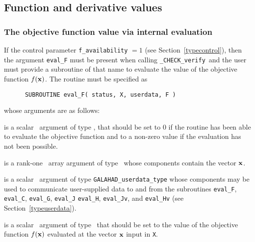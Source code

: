 \documentclass{galahad}
\newcommand{\packagename}{CHECK}
\newcommand{\fullpackagename}{\libraryname\_\packagename}
\newcommand{\solver}{{\tt \fullpackagename\_verify}}
\begin{document}

\subsection{Function and derivative values\label{fdv}}


\subsubsection{The objective function value via internal evaluation\label{ffv}}

If the control parameter {\tt f\_availability} $=1$ (see
Section~\ref{typecontrol}), then the argument
{\tt eval\_F} must be present when calling \solver\ and the
user must provide a subroutine of that name to evaluate the
value of the objective function $f({\mathbf{x}})$.
The routine must be specified as

\def\baselinestretch{0.8}
{\tt \begin{verbatim}
      SUBROUTINE eval_F( status, X, userdata, F ) \end{verbatim} }
\def\baselinestretch{1.0}
\noindent whose arguments are as follows:

\begin{description}
 is a scalar \intentout\ argument of type \integer,
that should be set to 0 if the routine has been able to evaluate 
the objective function
and to a non-zero value if the evaluation has not been possible.

 is a rank-one \intentin\ array argument of type \realdp\
whose components contain the vector ${\mathbf{x}}$.

 is a scalar \intentinout\ argument of type 
{\tt GALAHAD\_userdata\_type} whose components may be used
to communicate user-supplied data to and from the
subroutines {\tt eval\_F}, {\tt eval\_C}, {\tt eval\_G}, {\tt eval\_J}
{\tt eval\_H}, {\tt eval\_Jv}, and {\tt eval\_Hv} 
(see Section~\ref{typeuserdata}). 

 is a scalar \intentout\ argument of type \realdp\
that should be set to the value of the objective function $f({\mathbf{x}})$
evaluated at the vector ${\mathbf{x}}$ input in {\tt X}.

\end{description}

\end{document}
